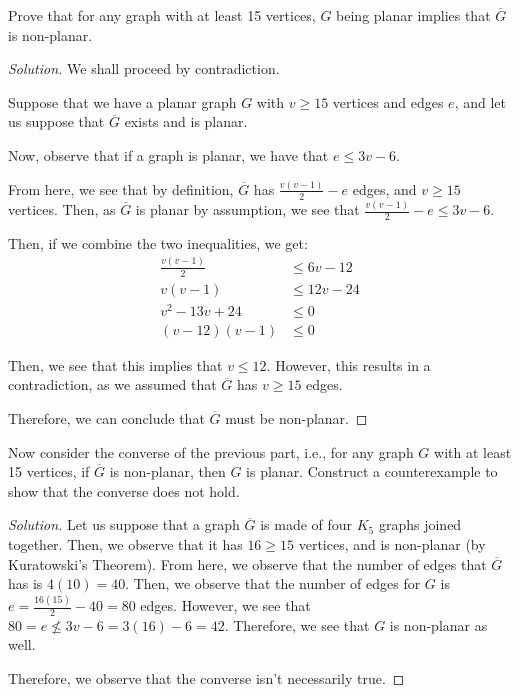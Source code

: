 \documentclass{article}
\newenvironment{solution}{\begin{proof}[Solution]}{\end{proof}}
\begin{document}
\begin{hw}
	Prove that for any graph with at least 15 vertices, $G$ being planar implies that $\overline{G}$ is non-planar.
\end{hw}
\begin{solution}
	We shall proceed by contradiction.
	
	Suppose that we have a planar graph $G$ with $v \geq 15$ vertices and edges $e$, and let us suppose that $\overline{G}$ exists and is planar.
	
	Now, observe that if a graph is planar, we have that $e \leq 3v - 6$. 
	
	From here, we see that by definition, $\overline{G}$ has $\frac{v(v-1)}{2}-e$ edges, and $v \geq 15$ vertices. Then, as $\overline{G}$ is planar by assumption, we see that $\frac{v(v-1)}{2}-e \leq 3v - 6$.
	
	Then, if we combine the two inequalities, we get:
	\begin{align*}
		\frac{v(v-1)}{2} &\leq 6v - 12 \\
		v(v-1) &\leq 12v - 24 \\
		v^{2} - 13v + 24 &\leq 0 \\
		(v-12)(v-1) &\leq 0
	\end{align*}

	Then, we see that this implies that $v \leq 12$. However, this results in a contradiction, as we assumed that $\overline{G}$ has $v \geq 15$ edges.
	
	Therefore, we can conclude that $\overline{G}$ must be non-planar.
\end{solution}

\begin{hw}
	Now consider the converse of the previous part, i.e., for any graph $G$ with at least 15 vertices, if $\overline{G}$ is non-planar, then $G$ is planar. Construct a counterexample to show that the converse does not hold.
\end{hw}
\begin{solution}
	Let us suppose that a graph $\overline{G}$ is made of four $K_{5}$ graphs joined together. Then, we observe that it has $16 \geq 15$ vertices, and is non-planar (by Kuratowski's Theorem). From here, we observe that the number of edges that $\overline{G}$ has is $4(10) = 40$. Then, we observe that the number of edges for $G$ is $e = \frac{16(15)}{2}-40 = 80$ edges. However, we see that $80 = e \not\leq 3v-6 = 3(16)-6 = 42$. Therefore, we see that $G$ is non-planar as well.
	
	Therefore, we observe that the converse isn't necessarily true.
\end{solution}
\end{document}
